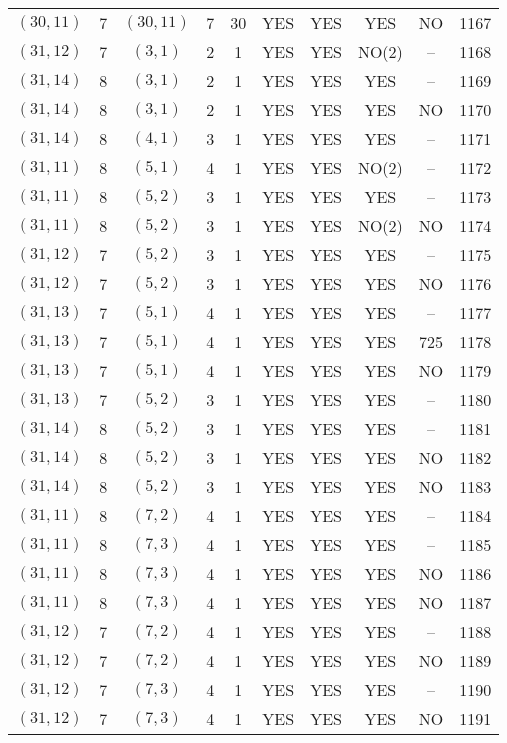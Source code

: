 \begin{longtable}{|c|c|c|c|c|c|c|c|c|c|}
$(30, 11)$ & 7 & $(30, 11)$ & 7 & 30 & YES & YES & YES & NO & 1167\\
$(31, 12)$ & 7 & $(3, 1)$ & 2 & 1 & YES & YES & NO(2) & -- & 1168\\
$(31, 14)$ & 8 & $(3, 1)$ & 2 & 1 & YES & YES & YES & -- & 1169\\
$(31, 14)$ & 8 & $(3, 1)$ & 2 & 1 & YES & YES & YES & NO & 1170\\
$(31, 14)$ & 8 & $(4, 1)$ & 3 & 1 & YES & YES & YES & -- & 1171\\
$(31, 11)$ & 8 & $(5, 1)$ & 4 & 1 & YES & YES & NO(2) & -- & 1172\\
$(31, 11)$ & 8 & $(5, 2)$ & 3 & 1 & YES & YES & YES & -- & 1173\\
$(31, 11)$ & 8 & $(5, 2)$ & 3 & 1 & YES & YES & NO(2) & NO & 1174\\
$(31, 12)$ & 7 & $(5, 2)$ & 3 & 1 & YES & YES & YES & -- & 1175\\
$(31, 12)$ & 7 & $(5, 2)$ & 3 & 1 & YES & YES & YES & NO & 1176\\
$(31, 13)$ & 7 & $(5, 1)$ & 4 & 1 & YES & YES & YES & -- & 1177\\
$(31, 13)$ & 7 & $(5, 1)$ & 4 & 1 & YES & YES & YES & 725 & 1178\\
$(31, 13)$ & 7 & $(5, 1)$ & 4 & 1 & YES & YES & YES & NO & 1179\\
$(31, 13)$ & 7 & $(5, 2)$ & 3 & 1 & YES & YES & YES & -- & 1180\\
$(31, 14)$ & 8 & $(5, 2)$ & 3 & 1 & YES & YES & YES & -- & 1181\\
$(31, 14)$ & 8 & $(5, 2)$ & 3 & 1 & YES & YES & YES & NO & 1182\\
$(31, 14)$ & 8 & $(5, 2)$ & 3 & 1 & YES & YES & YES & NO & 1183\\
$(31, 11)$ & 8 & $(7, 2)$ & 4 & 1 & YES & YES & YES & -- & 1184\\
$(31, 11)$ & 8 & $(7, 3)$ & 4 & 1 & YES & YES & YES & -- & 1185\\
$(31, 11)$ & 8 & $(7, 3)$ & 4 & 1 & YES & YES & YES & NO & 1186\\
$(31, 11)$ & 8 & $(7, 3)$ & 4 & 1 & YES & YES & YES & NO & 1187\\
$(31, 12)$ & 7 & $(7, 2)$ & 4 & 1 & YES & YES & YES & -- & 1188\\
$(31, 12)$ & 7 & $(7, 2)$ & 4 & 1 & YES & YES & YES & NO & 1189\\
$(31, 12)$ & 7 & $(7, 3)$ & 4 & 1 & YES & YES & YES & -- & 1190\\
$(31, 12)$ & 7 & $(7, 3)$ & 4 & 1 & YES & YES & YES & NO & 1191\\

\end{longtable}
